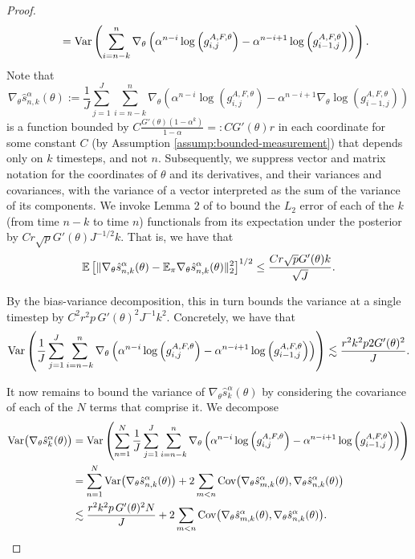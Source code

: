 \begin{proof}
\begin{align}
    &\qquad = \mathrm{Var} \left(\sum_{i=n-k}^n \nabla_\theta\left(\alpha^{n-i} \log\left(g_{i,j}^{A,F,\theta}\right)- \alpha^{n-i+1}\log\left(g_{i-1,j}^{A,F,\theta}\right)\right)\right).
\end{align}
Note that 
\begin{equation}
\nabla_\theta \hat s_{n,k}^\alpha(\theta) := \frac{1}{J}\sum_{j=1}^J\sum_{i=n-k}^n \nabla_\theta\left(\alpha^{n-i} \log\left(g_{i,j}^{A,F,\theta}\right)- \alpha^{n-i+1} \nabla_\theta \log\left(g_{i-1,j}^{A,F,\theta}\right)\right)
\end{equation} 
is a function bounded by $C\frac{G'(\theta)(1-\alpha^k)}{1-\alpha} =: CG'(\theta)r$ in each coordinate for some constant $C$ (by Assumption \ref{assump:bounded-measurement}) that depends only on $k$ timesteps, and not $n$. 
Subsequently, we suppress vector and matrix notation for the coordinates of $\theta$ and its derivatives, and their variances and covariances, with the variance of a vector interpreted as the sum of the variance of its components.
We invoke Lemma 2 of \cite{karjalainen23} to bound the $L_2$ error of each of the $k$ (from time $n-k$ to time $n$) functionals from its expectation under the posterior by $Cr\sqrt{p}G'(\theta)J^{-1/2}k$. 
That is, we have that
\begin{equation}\mathbb{E}\left[\|\nabla_\theta \hat s_{n,k}^\alpha(\theta) - \mathbb{E}_{\pi}\nabla_\theta \hat s_{n,k}^\alpha(\theta)\|_2^2\right]^{1/2} \leq \frac{Cr\sqrt{p}G'(\theta) k}{\sqrt{J}}.\end{equation}


By the bias-variance decomposition, this in turn bounds the variance at a single timestep by $C^2r^2p \, G'(\theta)^2J^{-1}k^2$. Concretely, we have that
\begin{equation}\mathrm{Var}\left(\frac{1}{J}\sum_{j=1}^J\sum_{i=n-k}^n \nabla_\theta\left(\alpha^{n-i} \log\left(g_{i,j}^{A,F,\theta}\right)- \alpha^{n-i+1} \log\left(g_{i-1,j}^{A,F,\theta}\right)\right)\right) \lesssim \frac{r^2k^2p2G'(\theta)^2}{J}.\end{equation}

It now remains to bound the variance of $\nabla_\theta \hat s_k^\alpha(\theta)$ by considering the covariance of each of the $N$ terms that comprise it. 
We decompose
\begin{align}
    \mathrm{Var}\big(\nabla_\theta \hat s_k^\alpha(\theta)\big) &= \mathrm{Var}\left(\sum_{n=1}^N \frac{1}{J}\sum_{j=1}^J\sum_{i=n-k}^n \nabla_\theta\left(\alpha^{n-i} \log\left(g_{i,j}^{A,F,\theta}\right)- \alpha^{n-i+1} \log\left(g_{i-1,j}^{A,F,\theta}\right)\right)\right) \\
    &= \sum_{n=1}^N\mathrm{Var}\big(\nabla_\theta \hat s_{n,k}^\alpha(\theta)\big)+ 2\sum_{m<n}\mathrm{Cov}\big(\nabla_\theta \hat s_{m,k}^\alpha(\theta), \nabla_\theta \hat s_{n,k}^\alpha(\theta)\big) \\
    &\lesssim \frac{r^2k^2p \, G'(\theta)^2N}{J} + 2\sum_{m<n}\mathrm{Cov}\big(\nabla_\theta \hat s_{m,k}^\alpha(\theta), \nabla_\theta \hat s_{n,k}^\alpha(\theta)\big).
\end{align}


\end{proof}
